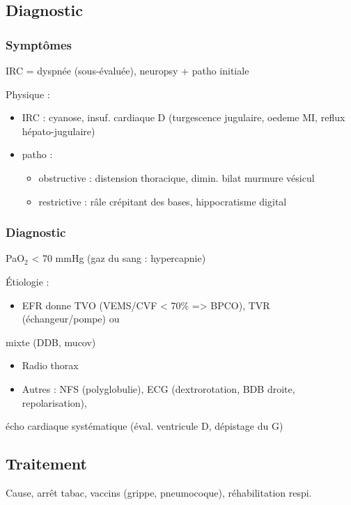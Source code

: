 \documentclass{book}
\begin{document}
\subsection{Diagnostic}
\label{sec:org2373ef7}
\label{sec:orgf8776e2}
\subsubsection{Symptômes}
\label{sec:org424d554}
\label{sec:org35a8cf3}
IRC = dyspnée (sous-évaluée), neuropsy + patho initiale

Physique : 

\begin{itemize}
\item IRC : cyanose, insuf. cardiaque D (turgescence jugulaire, oedeme MI, reflux
hépato-jugulaire)
\item patho : 

\begin{itemize}
\item obstructive : distension thoracique, dimin. bilat murmure vésicul
\item restrictive : râle crépitant des bases, hippocratisme digital
\end{itemize}
\end{itemize}



\subsubsection{Diagnostic}
\label{sec:org0b397e5}
\label{sec:org7599c0f}
PaO\(_{\text{2}}\) < 70 mmHg (gaz du sang : hypercapnie)

Étiologie :

\begin{itemize}
\item EFR donne TVO (VEMS/CVF < 70\% => BPCO), TVR (échangeur/pompe) ou
\end{itemize}
mixte (DDB, mucov)
\begin{itemize}
\item Radio thorax
\item Autres : NFS (polyglobulie), ECG (dextrorotation, BDB droite, repolarisation),
\end{itemize}
écho cardiaque systématique (éval. ventricule D, dépistage du G)


\subsection{Traitement}
\label{sec:org39bbf7b}
\label{sec:org870a2d5}
Cause, arrêt tabac, vaccins (grippe, pneumocoque), réhabilitation respi.
\end{document}
